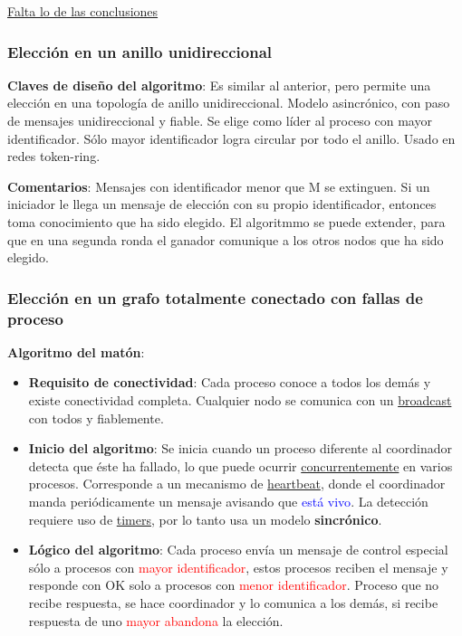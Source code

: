 \underline{Falta lo de las conclusiones}

\subsubsection{Elección en un anillo unidireccional} 

\textbf{Claves de diseño del algoritmo}: Es similar al anterior, pero permite una elección en una topología de anillo unidireccional. Modelo asincrónico, con paso de mensajes unidireccional y fiable. Se elige como líder al proceso con mayor identificador. Sólo mayor identificador logra circular por todo el anillo. Usado en redes token-ring.

\textbf{Comentarios}: Mensajes con identificador menor que M se extinguen. Si un iniciador le llega un mensaje de elección con su propio identificador, entonces toma conocimiento que ha sido elegido. El algoritmmo se puede extender, para que en una segunda ronda el ganador comunique a los otros nodos que ha sido elegido.

\subsubsection{Elección en un grafo totalmente conectado con fallas de proceso}

\textbf{Algoritmo del matón}:

\begin{itemize}
    \item \textbf{Requisito de conectividad}: Cada proceso conoce a todos los demás y existe conectividad completa. Cualquier nodo se comunica con un \underline{broadcast} con todos y fiablemente.

    \item \textbf{Inicio del algoritmo}: Se inicia cuando un proceso diferente al coordinador detecta que éste ha fallado, lo que puede ocurrir \underline{concurrentemente} en varios procesos. Corresponde a un mecanismo de \underline{heartbeat}, donde el coordinador manda periódicamente un mensaje avisando que \textcolor{blue}{está vivo}. La detección requiere uso de \underline{timers}, por lo tanto usa un modelo \textbf{sincrónico}.

    \item \textbf{Lógico del algoritmo}: Cada proceso envía un mensaje de control especial sólo a procesos con \textcolor{red}{mayor identificador}, estos procesos reciben el mensaje y responde con OK solo a procesos con \textcolor{red}{menor identificador}. Proceso que no recibe respuesta, se hace coordinador y lo comunica a los demás, si recibe respuesta de uno \textcolor{red}{mayor abandona} la elección.
\end{itemize}

